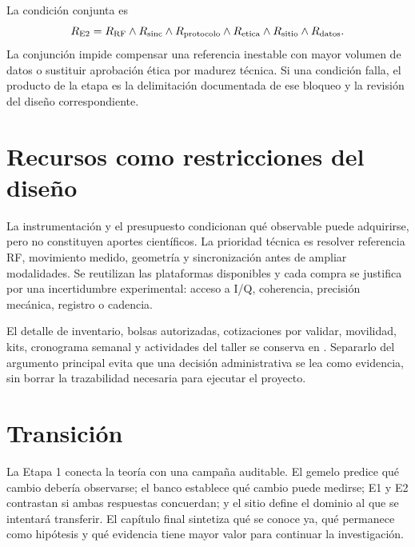 La condición conjunta es
\begin{equation}
R_{\rm E2}=
R_{\rm RF}\land
R_{\rm sinc}\land
R_{\rm protocolo}\land
R_{\rm etica}\land
R_{\rm sitio}\land
R_{\rm datos}.
\label{eq:stage2_gate}
\end{equation}
La conjunción impide compensar una referencia inestable con mayor volumen de datos
o sustituir aprobación ética por madurez técnica. Si una condición falla, el
producto de la etapa es la delimitación documentada de ese bloqueo y la revisión
del diseño correspondiente.

\section{Recursos como restricciones del diseño}

La instrumentación y el presupuesto condicionan qué observable puede adquirirse,
pero no constituyen aportes científicos. La prioridad técnica es resolver referencia
RF, movimiento medido, geometría y sincronización antes de ampliar modalidades. Se
reutilizan las plataformas disponibles y cada compra se justifica por una incertidumbre
experimental: acceso a I/Q, coherencia, precisión mecánica, registro o cadencia.

El detalle de inventario, bolsas autorizadas, cotizaciones por validar, movilidad,
kits, cronograma semanal y actividades del taller se conserva en
. Separarlo del argumento principal evita
que una decisión administrativa se lea como evidencia, sin borrar la trazabilidad
necesaria para ejecutar el proyecto.

\section{Transición}

La Etapa 1 conecta la teoría con una campaña auditable. El gemelo predice qué cambio
debería observarse; el banco establece qué cambio puede medirse; E1 y E2 contrastan
si ambas respuestas concuerdan; y el sitio define el dominio al que se intentará
transferir. El capítulo final sintetiza qué se conoce ya, qué permanece como hipótesis
y qué evidencia tiene mayor valor para continuar la investigación.
